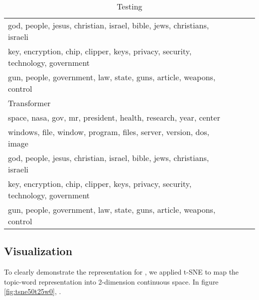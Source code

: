 \begin{table}[]
\begin{tabular}{llll}
god, people, jesus, christian, israel, bible, jews, christians, israeli\\
key, encryption, chip, clipper, keys, privacy, security, technology, government\\
gun, people, government, law, state, guns, article, weapons, control
\\ \hline
Transformer  \\ \hline
space, nasa, gov, mr, president, health, research, year, center\\
windows, file, window, program, files, server, version, dos, image\\
god, people, jesus, christian, israel, bible, jews, christians, israeli\\
key, encryption, chip, clipper, keys, privacy, security, technology, government\\
gun, people, government, law, state, guns, article, weapons, control
\\ \hline
\end{tabular}
\caption{Testing}
\end{table}
\subsection{Visualization}
To clearly demonstrate the representation for , we applied t-SNE to map the topic-word representation into 2-dimension continuous space. In figure \ref{fig:tsne50t25w0}, .

